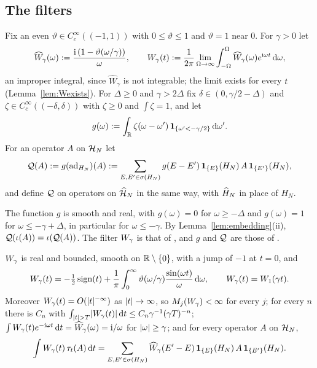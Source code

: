 \subsection{The filters}

\begin{definition}\label{def:filters}
Fix an even $\vartheta\in C_c^\infty((-1,1))$ with $0\le\vartheta\le1$ and $\vartheta=1$ near $0$. For $\gamma>0$ let
\[
\widehat W_\gamma(\omega):=\frac{\mathrm{i}\,(1-\vartheta(\omega/\gamma))}{\omega},\qquad
W_{\gamma}(t):=\frac1{2\pi}\lim_{\Omega\to\infty}\int_{-\Omega}^{\Omega}\widehat W_\gamma(\omega)e^{\mathrm{i}\omega t}\,\mathrm{d}\omega ,
\]
an improper integral, since $\widehat W_\gamma$ is not integrable; the limit exists for every $t$
(Lemma~\ref{lem:Wexists}).
For $\Delta\ge0$ and $\gamma>2\Delta$ fix $\delta\in(0,\gamma/2-\Delta)$ and $\zeta\in C_c^\infty((-\delta,\delta))$
with $\zeta\ge0$ and $\int\zeta=1$, and let
\[
g(\omega):=\int_{\mathbb{R}}\zeta(\omega-\omega')\,\mathbf{1}_{\{\omega'<-\gamma/2\}}\,\mathrm{d}\omega' .
\]
For an operator $A$ on $\mathcal{H}_N$ let
\[
\mathcal{Q}(A):=g(\operatorname{ad}_{H_N})(A):=\sum_{E,E'\in\sigma(H_N)}g(E-E')\,\mathbf{1}_{\{E\}}(H_N)\,A\,\mathbf{1}_{\{E'\}}(H_N),
\]
and define $\mathcal{Q}$ on operators on $\widehat{\mathcal{H}}_N$ in the same way, with $\widehat{H}_N$ in place of $H_N$.
\end{definition}

The function $g$ is smooth and real, with $g(\omega)=0$ for $\omega\ge-\Delta$ and $g(\omega)=1$ for
$\omega\le-\gamma+\Delta$, in particular for $\omega\le-\gamma$. By Lemma~\ref{lem:embedding}(ii), $\mathcal{Q}(\iota(A))=\iota(\mathcal{Q}(A))$. The filter $W_{\gamma}$ is that
of \cite[Section~4.1]{BBDF21}, and $g$ and $\mathcal{Q}$ are those of \cite[Appendix~A]{BBDF21}.

\begin{lemma}\label{lem:Wexists}
$W_{\gamma}$ is real and bounded, smooth on $\mathbb{R}\setminus\{0\}$, with a jump of $-1$ at $t=0$, and
\[
W_{\gamma}(t)=-\tfrac12\operatorname{sign}(t)+\frac1\pi\int_0^\infty\vartheta(\omega/\gamma)\frac{\sin(\omega t)}{\omega}\,\mathrm{d}\omega,
\qquad W_{\gamma}(t)=W_1(\gamma t).
\]
Moreover $W_{\gamma}(t)=O(\lvert t\rvert^{-\infty})$ as $\lvert t\rvert\to\infty$, so $M_j(W_{\gamma})<\infty$ for every $j$; for every $n$ there
is $C_n$ with $\int_{\lvert t\rvert>T}\lvert W_{\gamma}(t)\rvert\,\mathrm{d} t\le C_n\gamma^{-1}(\gamma T)^{-n}$; $\int W_{\gamma}(t)e^{-\mathrm{i}\omega t}\,\mathrm{d} t
=\widehat W_\gamma(\omega)=\mathrm{i}/\omega$ for $\lvert\omega\rvert\ge\gamma$; and for every operator $A$ on $\mathcal{H}_N$,
\[
\int W_{\gamma}(t)\,\tau_t(A)\,\mathrm{d} t=\sum_{E,E'\in\sigma(H_N)}\widehat W_\gamma(E'-E)\,\mathbf{1}_{\{E\}}(H_N)\,A\,\mathbf{1}_{\{E'\}}(H_N).
\]
\end{lemma}

